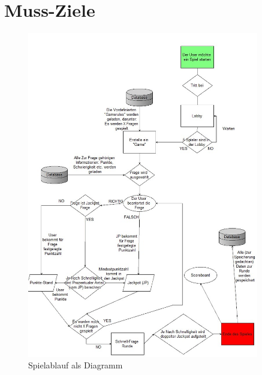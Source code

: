\documentclass[11pt,a4paper]{scrreprt}
\begin{document}
\section{Muss-Ziele}
\begin{figure}
	\centering
	\includegraphics[width=0.9\textwidth, height=0.9\textheight]{Diagramm_002.jpg}
	\caption{Spielablauf als Diagramm}
	\label{img:Spielablauf}
\end{figure}
\end{document}
